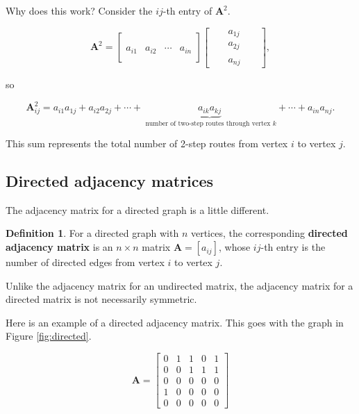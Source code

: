 \documentclass[
]{book}
\theoremstyle{definition}
\newtheorem{definition}{Definition}[chapter]
\theoremstyle{definition}
\theoremstyle{definition}
\theoremstyle{definition}
\theoremstyle{remark}
\begin{document}
Why does this work? Consider the \(ij\)-th entry of \(\mathbf{A}^2\).

\[\mathbf{A}^2=\begin{bmatrix}&&&\\&&&\\a_{i1} & a_{i2} &\cdots & a_{in}\\
&&&\end{bmatrix}\begin{bmatrix}&&a_{1j}&&\\&&a_{2j}&&\\&&&&\\&&a_{nj}&&\end{bmatrix},\]

so

\[\mathbf{A}^2_{ij}=a_{i1}a_{1j}+a_{i2}a_{2j}+\cdots+\underbrace{a_{ik}a_{kj}}_{\text{ number of two-step routes through vertex } k}+\cdots+a_{in}a_{nj}.\]

This sum represents the total number of 2-step routes from vertex \(i\) to vertex \(j\).

\subsection*{Directed adjacency matrices}\label{directed-adjacency-matrices}

The adjacency matrix for a directed graph is a little different.

\begin{defbox}

\begin{definition}
For a directed graph with \(n\) vertices, the corresponding \textbf{directed adjacency matrix} is an \(n\times n\) matrix \(\mathbf{A}=[a_{ij}]\), whose \(ij\)-th entry is the number of directed edges from vertex \(i\) to vertex \(j\).
\end{definition}

\end{defbox}

Unlike the adjacency matrix for an undirected matrix, the adjacency matrix for a directed matrix is not necessarily symmetric.

Here is an example of a directed adjacency matrix. This goes with the graph in Figure \ref{fig:directed}.

\[\mathbf{A}=\begin{bmatrix}
0 & 1 & 1 & 0 &  1\\
0 & 0 & 1 & 1 & 1\\
0 & 0 & 0 & 0 & 0\\
1 & 0 & 0 & 0 & 0\\
0 & 0 & 0 & 0 & 0
\end{bmatrix}\]
\end{document}
